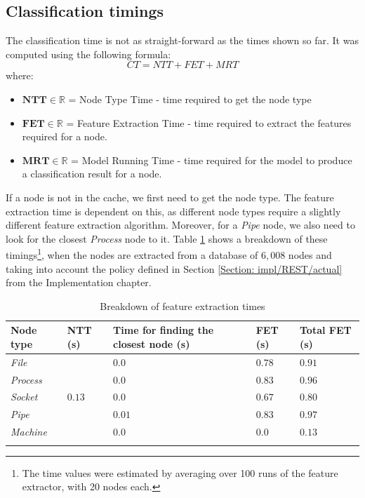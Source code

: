 		\subsection{Classification timings} \label{Section: eval/service-time/classification}
			The classification time is not as straight-forward as the times shown so far. It was computed using the following formula:
			\begin{equation}
				CT = NTT + FET + MRT
			\end{equation}
			where: 
			\begin{itemize}
				\item $\mathbf{NTT} \in \mathbb{R}$ = Node Type Time - time required to get the node type
				\item $\mathbf{FET} \in \mathbb{R}$ = Feature Extraction Time - time required to extract the features required for a node.
				\item $\mathbf{MRT} \in \mathbb{R}$ = Model Running Time - time required for the model to produce a classification result for a node.
			\end{itemize}
			If a node is not in the cache, we first need to get the node type. The feature extraction time is dependent on this, as different node types require a slightly different feature extraction algorithm. Moreover, for a \textit{Pipe} node, we also need to look for the closest \textit{Process} node to it. Table \ref{Table: eval/service-time/classification/fet} shows a breakdown of these timings\footnote{The time values were estimated by averaging over 100 runs of the feature extractor, with 20 nodes each.}, when the nodes are extracted from a database of $6,008$ nodes and taking into account the policy defined in Section \ref{Section: impl/REST/actual} from the Implementation chapter.
			\begin{longtable}{|p{} || p{} | p{}| p{}| p{} | }
				\textbf{Node type} & \textbf{NTT} (s) & \textbf{Time for finding the closest node} (s)& \textbf{FET} (s)& \textbf{Total FET} (s)\\
				\hline
				\textit{File} & \multirow{5}{*}{$0.13$}& $0.0$ & $0.78$& $\mathbf{0.91}$ \\
				\hhline{-~---}
				\textit{Process} & & $0.0$ & $0.83$ & $\mathbf{0.96}$\\
				\hhline{-~---}
				\textit{Socket} & & $0.0$ & $0.67$ & $\mathbf{0.80}$ \\
				\hhline{-~---}
				\textit{Pipe} & & $0.01$ & $0.83$ & $\mathbf{0.97}$ \\
				\hhline{-~---}
				\textit{Machine} & & $0.0$ & $0.0$ & $\mathbf{0.13}$\\
				\hline
				\caption{Breakdown of feature extraction times}
				\label{Table: eval/service-time/classification/fet}
			\end{longtable}		
